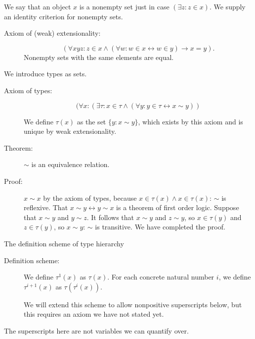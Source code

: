\documentclass{slides}
\begin{document}
\begin{slide}



We say that an object $x$ is a nonempty set just in case $(\exists z:z \in x)$.  We supply an identity criterion for nonempty sets.

\begin{description}

\item[Axiom of (weak) extensionality:]  $$(\forall xyz: z \in x \wedge (\forall w:w \in x \leftrightarrow w \in y) \rightarrow x=y).$$ Nonempty sets with the same elements are equal.

\end{description}

\end{slide}

\begin{slide}

We introduce types as sets.

\begin{description}

\item[Axiom of types:]  $$(\forall x:(\exists \tau:x \in \tau \wedge (\forall y:y \in \tau \leftrightarrow x \sim y))$$

We define $\tau(x)$ as the set $\{y:x \sim y\}$, which exists by this axiom and is unique by weak extensionality.

\item[Theorem:]  $\sim$ is an equivalence relation.

\item[Proof:]  $x \sim x$ by the axiom of types, because $x \in \tau(x) \wedge x \in \tau(x)$:  $\sim $ is reflexive.  That $x \sim y \leftrightarrow y \sim x$ is a theorem of first order logic.  Suppose that $x \sim y$ and $y \sim z$.  It follows that
$x \sim y$ and $z \sim y$, so $x \in \tau(y)$ and $z \in \tau(y)$, so $x \sim y$:  $\sim$ is transitive.  We have completed the proof.

\end{description}

\end{slide}

\begin{slide}

{\Large The definition scheme of type hierarchy}

\begin{description}


\item[Definition scheme:]  We define $\tau^1(x)$ as $\tau(x)$.  For each concrete natural number $i$, we define $\tau^{i+1}(x)$ as $\tau(\tau^i(x))$.

We will extend this scheme to allow nonpositive superscripts below, but this requires an axiom we have not stated yet.

\end{description}

The superscripts here are not variables we can quantify over.

\end{slide}
\end{document}
